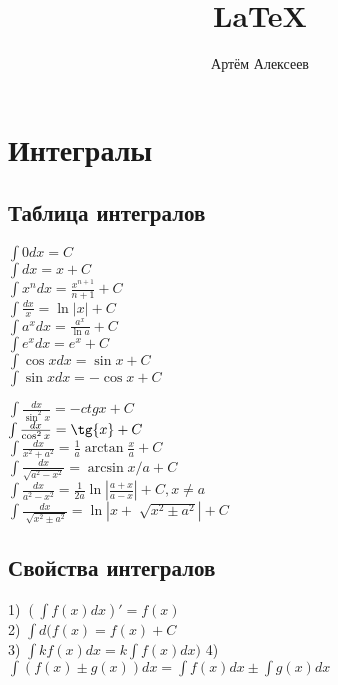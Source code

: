 \documentclass[12pt,a4paper]{article}
\title{\LaTeX}
\date{}
\author{Артём Алексеев}
\begin{document}
  

\section{Интегралы}
\subsection{Таблица интегралов}

\begin{minipage}{0.4\textwidth}
\begin{flushleft}
$ \int{0dx} = C $ \\
$ \int{dx} = x + C $ \\ 
$ \int{x^n dx} = \frac{x^{n+1}}{n+1} + C $ \\
$ \int{\frac{dx}{x}} = \ln{|x|} + C $ \\
$ \int{a^x dx} = \frac{a^x}{\ln{a}} + C $ \\
$ \int{e^x dx} = e^x + C $ \\ 
$ \int{\cos{x}dx} = \sin{x} + C $ \\
$ \int{\sin{x}dx} = -\cos{x} + C $
\end{flushleft}
\end{minipage}
\hfill
\begin{minipage}{0.5\textwidth}
\begin{flushleft}
$ \int{\frac{dx}{\sin^2{x}}} = -ctg{x} + C $ \\
$ \int{\frac{dx}{\cos^2{x}}} = \tg{x} + C $ \\
$ \int{\frac{dx}{x^2+a^2}} = \frac{1}{a} \arctan \frac{x}{a} + C $ \\
$ \int{\frac{dx}{\sqrt{a^2-x^2}}} = \arcsin{x/a} + C $ \\
$ \int{\frac{dx}{a^2-x^2}}=\frac{1}{2a}\ln{|\frac{a+x}{a-x}|} + C, x \neq a $ \\
$ \int{\frac{dx}{\sqrt[]{x^2 \pm a^2}}} = \ln{|x + \sqrt[]{x^2 \pm a^2}|} + C $
\end{flushleft}
\end{minipage}

\subsection{Свойства интегралов}
1) $ (\int{f(x)dx})' = f(x) $ \\
2) $ \int{d(f(x)} = f(x) + C $ \\
3) $ \int{k f(x)dx} = k \int{f(x)dx)} $ 
4) $ \int{(f(x) \pm g(x))dx} = \int{f(x)dx} \pm \int{g(x)dx}$
\end{document}
